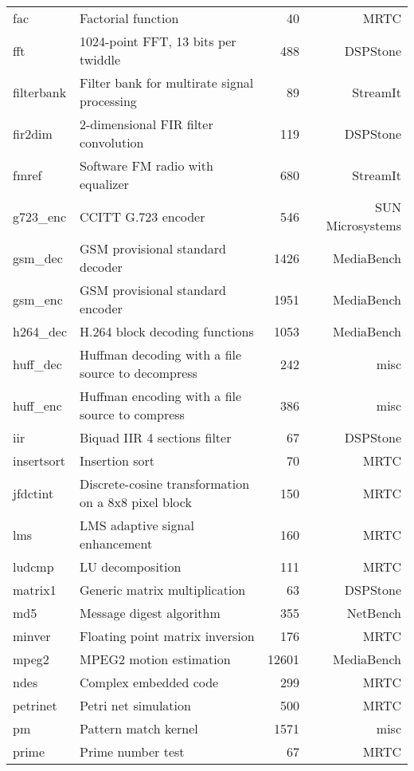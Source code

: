 \documentclass[a4paper,UKenglish]{oasics}
\begin{document}
\begin{center}
\begin{longtable}{lp{5cm}rr}
    fac &  Factorial function & 40 & MRTC \\
    fft &  1024-point FFT, 13 bits per twiddle  & 488  & DSPStone \\
    filterbank & Filter bank for multirate signal processing  & 89 & StreamIt \\
    fir2dim &  2-dimensional FIR filter convolution & 119 & DSPStone \\
    fmref &  Software FM radio with equalizer & 680  & StreamIt \\
    g723\_enc &  CCITT G.723 encoder  & 546  & SUN Microsystems \\
    gsm\_dec & GSM provisional standard decoder & 1426 & MediaBench \\
    gsm\_enc & GSM provisional standard encoder & 1951 & MediaBench \\
    h264\_dec &  H.264 block decoding functions & 1053 & MediaBench \\
    huff\_dec &  Huffman decoding with a file source to decompress  & 242  & misc \\
    huff\_enc & Huffman encoding with a file source to compress  & 386  & misc \\
    iir &  Biquad IIR 4 sections filter & 67 & DSPStone \\
    insertsort & Insertion sort & 70 & MRTC \\
    jfdctint & Discrete-cosine transformation on a 8x8 pixel block  & 150  & MRTC \\
    lms &  LMS adaptive signal enhancement  & 160  & MRTC \\
    ludcmp & LU decomposition & 111 & MRTC \\
    matrix1 &  Generic matrix multiplication  & 63 & DSPStone \\
    md5 &  Message digest algorithm & 355  & NetBench \\
    minver & Floating point matrix inversion  & 176  & MRTC \\
    mpeg2 &  MPEG2 motion estimation  & 12601 & MediaBench \\
    ndes & Complex embedded code  & 299  & MRTC \\

    petrinet & Petri net simulation & 500  & MRTC \\
    pm & Pattern match kernel & 1571  & misc \\
    prime &  Prime number test  & 67 & MRTC \\


\end{longtable}
\end{center}
\end{document}
